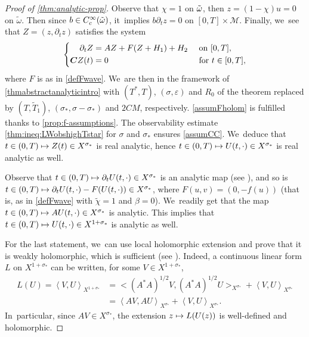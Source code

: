\documentclass[JEP,XML,SOM,Unicode,published]{cedram}
\newcommand\mto{\mathchoice{\longmapsto}{\mapsto}{\mapsto}{\mapsto}}
\theoremstyle{definition}
\let\mc\mathcal
\let\veps\varepsilon
\newcommand{\M}{\mc{M}}
\newcommand{\bC}{\boldsymbol{C}}
\begin{document}
\begin{proof}[Proof of \cref{thm:analytic-prop}]
Observe that $\chi=1$ on $\Tilde{\omega}$, then $z=(1-\chi)u=0$ on $\widetilde{\omega}$. Then since $b\in C^{\infty}_c(\Tilde{\omega})$, it~implies $b\partial_t z=0$ on $[0,T]\times \M$.
Finally, we~see that $Z=(z, \partial_t z)$ satisfies the system
\begin{equation}\label{thm:proof:eq:}
\left\{\begin{aligned}
\partial_t Z&=AZ+F(Z+H_{1})+H_{2}&&\textnormal{ on } [0,T], \\
\bC Z(t)&=0 &&\textnormal{ for }t\in [0,T],
\end{aligned}\right.
\end{equation}
where $F$ is as in \eqref{defFwave}. We~are then in the framework of \cref{thmabstractanalyticintro} with $(T^*, T)$, $(\sigma, \veps)$ and $R_0$ of the theorem replaced by $(T, \widetilde{T}_1)$, $(\sigma_*, \sigma-\sigma_*)$ and $2CM$, respectively. \cref{assumFholom} is fulfilled thanks to \cref{prop:f-assumptions}. The observability estimate \eqref{thm:ineq:LWobshighTstar} for $\sigma$ and $\sigma_*$ ensures \cref{assumCC}. We~deduce that $t\in (0, T)\mto Z(t)\in X^{\sigma_*}$ is real analytic, hence $t\in (0, T)\mto U(t, \cdot)\in X^{\sigma_*}$ is real analytic as well.

Observe that $t\in (0, T)\mto \partial_t U(t, \cdot)\in X^{\sigma_*}$ is an analytic map (see \cite[Prop.\,6.4]{BS:71-analytic}), and so is $t\in (0, T)\mto \partial_t U(t, \cdot)-F(U(t,\cdot))\in X^{\sigma_*}$, where $F(u,v)=(0,-f(u))$ (that is, as in \eqref{defFwave} with $\widetilde{\chi}=1$ and $\beta=0$). We~readily get that the map $t\in (0, T)\mto A U(t, \cdot)\in X^{\sigma_*}$ is analytic. This implies that $t\in (0, T)\mto U(t, \cdot)\in X^{1+\sigma_*}$ is analytic as well.

For the last statement, we~can use local holomorphic extension and prove that it is weakly holomorphic, which is sufficient (see \cite[Th.\,8.12]{Muj86}). Indeed, a continuous linear form $L$ on $X^{1+\sigma_*}$ can be written, for some $V\in X^{1+\sigma_*}$,\vspace*{-3pt}
\begin{align*}
L(U)=\left<V,U\right>_{X^{1+\sigma_*}}&=\bigl<(A^*A)^{1/2}V,(A^*A)^{1/2}U\bigr>_{X^{\sigma_*}}+\left<V,U\right>_{X^{\sigma_*}}\\
&=\left<AV,AU\right>_{X^{\sigma_*}}+\left<V,U\right>_{X^{\sigma_*}}.
\end{align*}
In~particular, since $AV\in X^{\sigma_*}$, the extension $z\mto L(U(z))$ is well-defined and holomorphic.
\end{proof}
\end{document}
